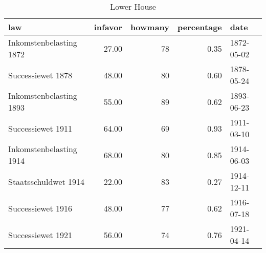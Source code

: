 \begin{table}[ht]
\centering
\begin{tabular}{lrrrl}
  \hline
law & infavor & howmany & percentage & date \\ 
  \hline
Inkomstenbelasting 1872 & 27.00 &  78 & 0.35 & 1872-05-02 \\ 
  Successiewet 1878 & 48.00 &  80 & 0.60 & 1878-05-24 \\ 
  Inkomstenbelasting 1893 & 55.00 &  89 & 0.62 & 1893-06-23 \\ 
  Successiewet 1911 & 64.00 &  69 & 0.93 & 1911-03-10 \\ 
  Inkomstenbelasting 1914 & 68.00 &  80 & 0.85 & 1914-06-03 \\ 
  Staatsschuldwet 1914 & 22.00 &  83 & 0.27 & 1914-12-11 \\ 
  Successiewet 1916 & 48.00 &  77 & 0.62 & 1916-07-18 \\ 
  Successiewet 1921 & 56.00 &  74 & 0.76 & 1921-04-14 \\ 
   \hline
\end{tabular}
\caption{Lower House} 
\end{table}
